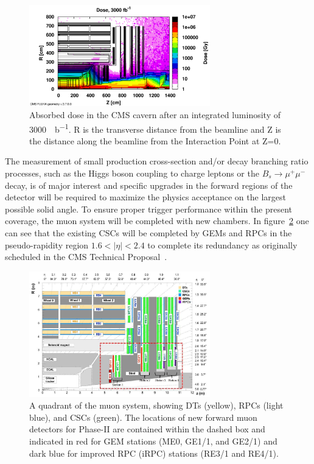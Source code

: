 \begin{figure}[H]
	\centering
	\includegraphics[width=0.7\textwidth]{fig/HL-LHC-Dose.png}
	\caption{\label{fig:Dose} Absorbed dose in the CMS cavern after an integrated luminosity of \SI{3000}{\femto\per\barn}. R is the transverse distance from the beamline and Z is the distance along the beamline from the Interaction Point at Z=0.}
\end{figure}

The measurement of small production cross-section and/or decay branching ratio processes, such as the Higgs boson coupling to charge leptons or the $B_s \longrightarrow \mu^+\mu^-$ decay, is of major interest and specific upgrades in the forward regions of the detector will be required to maximize the physics acceptance on the largest possible solid angle. To ensure proper trigger performance within the present coverage, the muon system will be completed with new chambers. In figure~\ref{fig:Quadrant} one can see that the existing \acfp{CSC} will be completed by \acfp{GEM} and \acfp{RPC} in the pseudo-rapidity region $1.6<\vert\eta\vert<2.4$ to complete its redundancy as originally scheduled in the CMS Technical Proposal~\cite{CMSTP}.

\begin{figure}[H]
	\centering
	\includegraphics[width=0.7\textwidth]{fig/MuonUpgrade-Plans.jpg}
	\caption{\label{fig:Quadrant} A quadrant of the muon system, showing DTs (yellow), RPCs (light blue), and CSCs (green). The locations of new forward muon detectors for Phase-II are contained within the dashed box and indicated in red for GEM stations (ME0, GE1/1, and GE2/1) and dark blue for improved RPC (iRPC) stations (RE3/1 and RE4/1).}
\end{figure}

